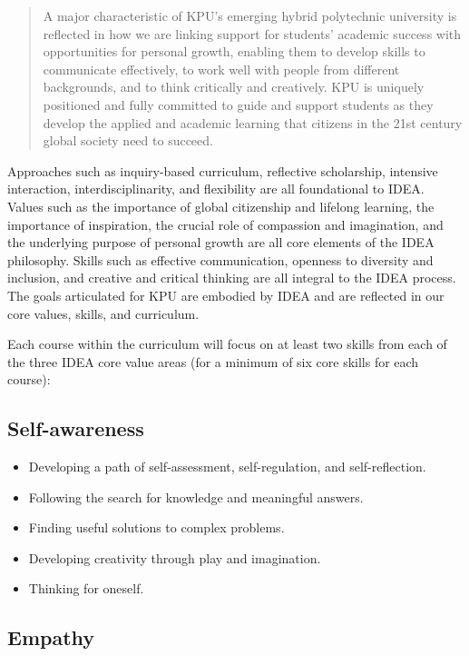 \documentclass[letterpaper,10pt,headsepline]{scrreprt}
\begin{document}
\begin{quote}
A major characteristic of KPU's emerging hybrid polytechnic university
is reflected in how we are linking support for students' academic
success with opportunities for personal growth, enabling them to develop
skills to communicate effectively, to work well with people from
different backgrounds, and to think critically and creatively. KPU is
uniquely positioned and fully committed to guide and support students as
they develop the applied and academic learning that citizens in the 21st
century global society need to succeed.
\end{quote}

Approaches such as inquiry-based curriculum, reflective scholarship,
intensive interaction, interdisciplinarity, and flexibility are all
foundational to IDEA. Values such as the importance of global
citizenship and lifelong learning, the importance of inspiration, the
crucial role of compassion and imagination, and the underlying purpose
of personal growth are all core elements of the IDEA philosophy. Skills
such as effective communication, openness to diversity and inclusion,
and creative and critical thinking are all integral to the IDEA process.
The goals articulated for KPU are embodied by IDEA and are reflected in
our core values, skills, and curriculum.

Each course within the curriculum will focus on at least two skills from
each of the three IDEA core value areas (for a minimum of six core
skills for each course):

\subsection{Self-awareness}

\begin{itemize}
\itemsep1pt\parskip0pt
\item
  Developing a path of self-assessment, self-regulation, and
  self-reflection.
\item
  Following the search for knowledge and meaningful answers.
\item
  Finding useful solutions to complex problems.
\item
  Developing creativity through play and imagination.
\item
  Thinking for oneself.
\end{itemize}

\subsection{Empathy}
\end{document}
